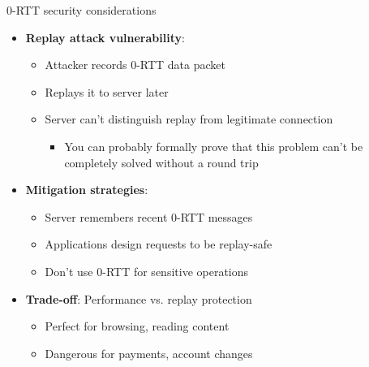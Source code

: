 \documentclass[aspectratio=169, lualatex, handout]{beamer}
\begin{document}
\begin{frame}{0-RTT security considerations}
	\begin{itemize}[<+->]
		\item \textbf{Replay attack vulnerability}:
		      \begin{itemize}
			      \item Attacker records 0-RTT data packet
			      \item Replays it to server later
			      \item Server can't distinguish replay from legitimate connection
			            \begin{itemize}
				            \item You can probably formally prove that this problem can't be completely solved without a round trip
			            \end{itemize}
		      \end{itemize}
		\item \textbf{Mitigation strategies}:
		      \begin{itemize}
			      \item Server remembers recent 0-RTT messages
			      \item Applications design requests to be replay-safe
			      \item Don't use 0-RTT for sensitive operations
		      \end{itemize}
		\item \textbf{Trade-off}: Performance vs. replay protection
		      \begin{itemize}
			      \item Perfect for browsing, reading content
			      \item Dangerous for payments, account changes
		      \end{itemize}
	\end{itemize}
\end{frame}
\end{document}
